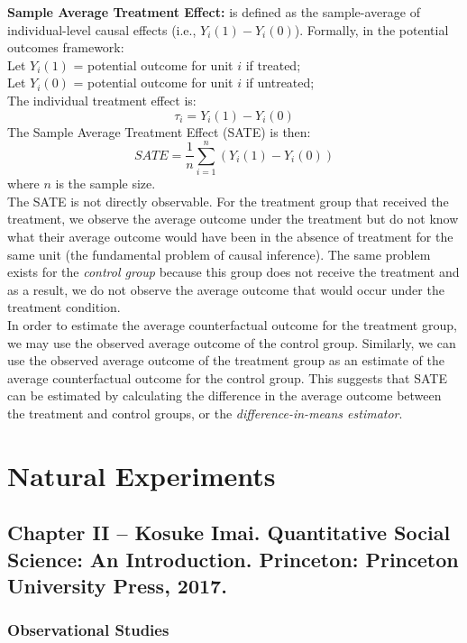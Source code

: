 \documentclass{article}
\begin{document}
    \noindent \textbf{Sample Average Treatment Effect:} is defined as the
sample-average of individual-level causal effects (i.e., $Y_i(1) - Y_i(0)$).
Formally, in the potential outcomes framework:\\

    Let $Y_i(1)$ = potential outcome for unit $i$ if treated;\\
    \indent Let $Y_i(0)$ = potential outcome for unit $i$ if untreated;\\
    \indent The individual treatment effect is:\\
    \[
        \tau_{i} = Y_i(1) - Y_i(0)
    \]
    \indent The Sample Average Treatment Effect (SATE) is then:
    \[
        SATE = \frac{1}{n}\sum^{n}_{i=1}(Y_i(1)-Y_i(0))
    \]
    \indent where $n$ is the sample size.\\

    \noindent The SATE is not directly observable. For the treatment group
that received the treatment, we observe the average outcome under the
treatment but do not know what their average outcome would have been in the
absence of treatment for the same unit (the fundamental problem of causal
inference). The same problem exists for the \textit{control group} because
this group does not receive the treatment and as a result, we do not
observe the average outcome that would occur under the treatment condition.\\

    \noindent In order to estimate the average counterfactual outcome for
the treatment group, we may use the observed average outcome of the control
group. Similarly, we can use the observed average outcome of the treatment
group as an estimate of the average counterfactual outcome for the control
group. This suggests that SATE can be estimated by calculating the
difference in the average outcome between the treatment and control groups,
or the \textit{difference-in-means estimator}.

\section{Natural Experiments}
    \subsection{Chapter II -- Kosuke Imai. Quantitative Social Science: An Introduction. Princeton: Princeton University Press, 2017.}
    \subsubsection{Observational Studies}
\end{document}
